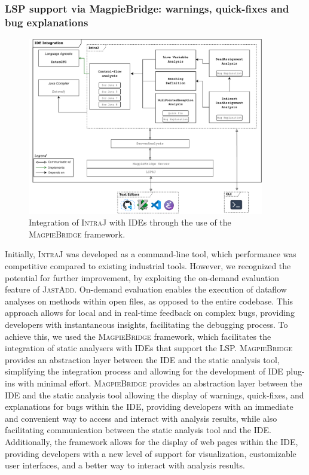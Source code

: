 \subsubsection{LSP support via MagpieBridge: warnings, quick-fixes and bug explanations}
\begin{figure}
  \centering
  \includegraphics[width=0.92\textwidth]{kappa/img/IDEIntegration.pdf}
  \caption{\label{fig:IDEIntegration} Integration of \textsc{IntraJ} with IDEs through the use of the \textsc{MagpieBridge} framework.}
\end{figure}
Initially, \textsc{IntraJ} was developed as a command-line tool, which performance was competitive
compared to existing industrial tools. However, we recognized the potential
for further improvement, by exploiting the on-demand evaluation feature of \textsc{JastAdd}.
On-demand evaluation enables the execution of dataflow analyses
on methods within open files, as opposed to the entire codebase. This approach
allows for local and in real-time feedback on complex bugs, providing developers
with instantaneous insights, facilitating the debugging process.
To achieve this, we used the \textsc{MagpieBridge} framework, which facilitates the integration
of static analysers with IDEs that support the LSP. \textsc{MagpieBridge} provides an
abstraction layer between the IDE and the static analysis tool, simplifying the
integration process and allowing for the development of IDE plug-ins with minimal effort.
\textsc{MagpieBridge} provides an abstraction layer between the IDE and the static
analysis tool allowing the display of warnings, quick-fixes, and explanations
for bugs within the IDE, providing developers with an immediate and convenient way to
access and interact with analysis results, while also facilitating communication
between the static analysis tool and the IDE. Additionally, the framework allows
for the display of web pages within the IDE, providing developers with a new level
of support for visualization, customizable user interfaces, and a better way to
interact with analysis results.

